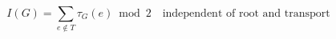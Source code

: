\documentclass{article}
\begin{document}
\[
I(G)=\sum_{e\notin T}\tau_G(e)\bmod 2
\quad\text{independent of root and transport}
\]
\end{document}
